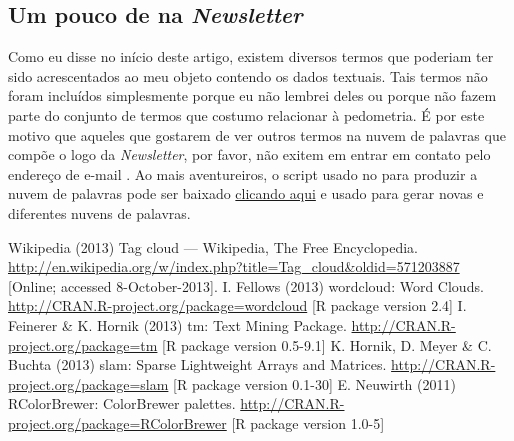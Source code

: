 \subsection{Um pouco de \R{} na \textit{Newsletter}}
Como eu disse no início deste artigo, existem diversos termos que poderiam ter sido acrescentados ao meu objeto contendo os dados textuais. Tais termos não foram incluídos simplesmente porque eu não lembrei deles ou porque não fazem parte do conjunto de termos que costumo relacionar à pedometria. É por este motivo que aqueles que gostarem de ver outros termos na nuvem de palavras que compõe o logo da \textit{Newsletter}, por favor, não exitem em entrar em contato pelo endereço de e-mail . Ao mais aventureiros, o script usado no \R{} para produzir a nuvem de palavras pode ser baixado \href{http://goo.gl/tqGmI1}{clicando aqui} e usado para gerar novas e diferentes nuvens de palavras.
\begin{footnotesize}
\begin{thebibliography}{99}
Wikipedia (2013)
\newblock Tag cloud --- Wikipedia, The Free Encyclopedia.
\newblock \url{http://en.wikipedia.org/w/index.php?title=Tag_cloud&oldid=571203887} [Online; accessed 8-October-2013].
I. Fellows (2013)
\newblock wordcloud: Word Clouds.
\newblock \url{http://CRAN.R-project.org/package=wordcloud} [R package version 2.4]
I. Feinerer \& K. Hornik (2013)
\newblock tm: Text Mining Package.
\newblock \url{http://CRAN.R-project.org/package=tm} [R package version 0.5-9.1]
K. Hornik, D. Meyer \& C. Buchta (2013)
\newblock slam: Sparse Lightweight Arrays and Matrices.
\newblock \url{http://CRAN.R-project.org/package=slam} [R package version 0.1-30]
E. Neuwirth (2011)
\newblock RColorBrewer: ColorBrewer palettes.
\newblock \url{http://CRAN.R-project.org/package=RColorBrewer} [R package version 1.0-5]
\end{thebibliography}
\end{footnotesize}
\address{Alessandro Samuel-Rosa\\
  Universidade Federal Rural do Rio de Janeiro\\
  \url{soil-scientist.net}\\
  }

